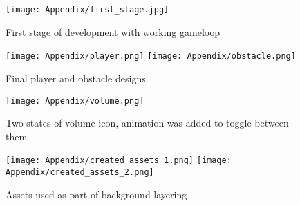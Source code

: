\documentclass[oneside,a4paper,11pt]{report}
\begin{document}
\begin{figure}[!htb]
	\centering
	\texttt{[image: Appendix/first\_stage.jpg]}
	\caption{First stage of development with working gameloop}
\end{figure}

\begin{figure}[!htb]
	\centering
	\texttt{[image: Appendix/player.png]}
	\texttt{[image: Appendix/obstacle.png]}
	\caption{Final player and obstacle designs}
\end{figure}

\begin{figure}
	\centering
	\texttt{[image: Appendix/volume.png]}
	\caption{Two states of volume icon, animation was added to toggle between them}
\end{figure}

\begin{figure}
	\centering
	\texttt{[image: Appendix/created\_assets\_1.png]}
	\texttt{[image: Appendix/created\_assets\_2.png]}
	\caption{Assets used as part of background layering}
\end{figure}
\end{document}
